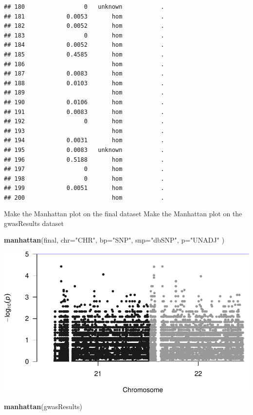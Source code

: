 \documentclass[
]{article}
\newenvironment{Shaded}{\begin{snugshade}}{\end{snugshade}}
\newcommand{\DataTypeTok}[1]{\textcolor[rgb]{0.13,0.29,0.53}{#1}}
\newcommand{\KeywordTok}[1]{\textcolor[rgb]{0.13,0.29,0.53}{\textbf{#1}}}
\newcommand{\NormalTok}[1]{#1}
\newcommand{\StringTok}[1]{\textcolor[rgb]{0.31,0.60,0.02}{#1}}
\begin{document}
\begin{verbatim}
## 180                 0   unknown           .
## 181            0.0053       hom           .
## 182            0.0052       hom           .
## 183                 0       hom           .
## 184            0.0052       hom           .
## 185            0.4585       hom           .
## 186                         hom           .
## 187            0.0083       hom           .
## 188            0.0103       hom           .
## 189                         hom           .
## 190            0.0106       hom           .
## 191            0.0083       hom           .
## 192                 0       hom           .
## 193                         hom           .
## 194            0.0031       hom           .
## 195            0.0083   unknown           .
## 196            0.5188       hom           .
## 197                 0       hom           .
## 198                 0       hom           .
## 199            0.0051       hom           .
## 200                         hom           .
\end{verbatim}

Make the Manhattan plot on the final dataset Make the Manhattan plot on
the gwasResults dataset

\begin{Shaded}
\begin{Highlighting}[]
\KeywordTok{manhattan}\NormalTok{(final, }\DataTypeTok{chr=}\StringTok{"CHR"}\NormalTok{, }\DataTypeTok{bp=}\StringTok{"SNP"}\NormalTok{, }\DataTypeTok{snp=}\StringTok{"dbSNP"}\NormalTok{, }\DataTypeTok{p=}\StringTok{"UNADJ"}\NormalTok{ )}
\end{Highlighting}
\end{Shaded}

\includegraphics{GWASvisualizations_files/figure-latex/unnamed-chunk-9-1.pdf}

\begin{Shaded}
\begin{Highlighting}[]
\KeywordTok{manhattan}\NormalTok{(gwasResults)}
\end{Highlighting}
\end{Shaded}
\end{document}
